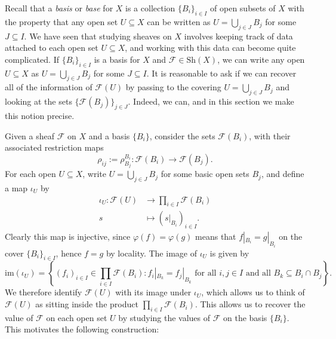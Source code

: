 \documentclass[10pt,oneside]{book}
\def\~#1{\mathscr{#1}}
\newcommand{\Sh}{\mathrm{Sh}}
\newcommand{\im}{\mathrm{im}}
\newcommand{\vp}{\varphi}
\theoremstyle{plain}
\theoremstyle{definition}
\theoremstyle{remark}
\numberwithin{equation}{section}
\numberwithin{figure}{section}
\begin{document}
 Recall that a \emph{basis} or \emph{base} for $X$ is a collection $\{B_i\}_{i \in I}$ of open subsets of $X$ with the property that any open set $U \subseteq X$ can be written as $U = \bigcup_{j \in J} B_j$ for some $J \subseteq I$. We have seen that studying sheaves on $X$ involves keeping track of data attached to each open set $U \subseteq X$, and working with this data can become quite complicated. If $\{B_i\}_{i \in I}$ is a basis for $X$ and $\~F \in \Sh(X)$, we can write any open $U \subseteq X$ as $U = \bigcup_{j \in J} B_j$ for some $J \subseteq I$. It is reasonable to ask if we can recover all of the information of $\~F(U)$ by passing to the covering $U = \bigcup_{j \in J} B_j$ and looking at the sets $\{\~F(B_j)\}_{j \in J}$. Indeed, we can, and in this section we make this notion precise. 

Given a sheaf $\~F$ on $X$ and a basis $\{B_i\}$, consider the sets $\~F(B_i)$, with their associated restriction maps
\[\rho_{ij} := \rho^{B_i}_{B_j}: \~F(B_i) \to \~F(B_j).\]
For each open $U \subseteq X$, write $U = \bigcup_{j \in J}B_j$ for some basic open sets $B_j$, and define a map $\iota_U$ by
\begin{align*}
    \iota_U: \~F(U) &\to \prod_{i \in I} \~F(B_i) \\ 
    s &\mapsto \left(s|_{B_i}\right)_{i \in I}.
\end{align*}
Clearly this map is injective, since $\vp(f) = \vp(g)$ means that $f|_{B_i} = g|_{B_i}$ on the cover $\{B_i\}_{i \in I}$, hence $f = g$ by locality. The image of $\iota_U$ is given by
\[\im(\iota_U) = \left\{(f_i)_{i \in I} \in  \prod_{i \in I} \~F(B_i) : f_i|_{B_k} = f_j|_{B_k} \text{ for all } i, j \in I \text{ and all } B_k \subseteq B_i \cap B_j \right\}.\]
We therefore identify $\~F(U)$ with its image under $\iota_U$, which allows us to think of $\~F(U)$ as sitting inside the product $\prod_{i \in I} \~F(B_i)$. This allows us to recover the value of $\~F$ on each open set $U$ by studying the values of $\~F$ on the basis $\{B_i\}$. This motivates the following construction: 
\end{document}
